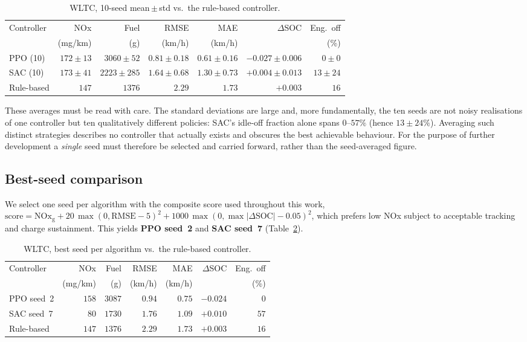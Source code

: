 \begin{table}[ht]
\centering
\caption{WLTC, 10-seed mean\,$\pm$\,std vs.\ the rule-based controller.}
\label{tab:wltc-mean}
\small
\begin{tabular}{lrrrrrr}
\toprule
Controller & NOx & Fuel & RMSE & MAE & $\Delta$SOC & Eng.\ off \\
 & (mg/km) & (g) & (km/h) & (km/h) & & (\%) \\
\midrule
PPO (10)   & $172\pm13$ & $3060\pm52$  & $0.81\pm0.18$ & $0.61\pm0.16$ & $-0.027\pm0.006$ & $0\pm0$  \\
SAC (10)   & $173\pm41$ & $2223\pm285$ & $1.64\pm0.68$ & $1.30\pm0.73$ & $+0.004\pm0.013$ & $13\pm24$ \\
Rule-based & $147$      & $1376$       & $2.29$        & $1.73$        & $+0.003$         & $16$ \\
\bottomrule
\end{tabular}
\end{table}

These averages must be read with care. The standard deviations are large and,
more fundamentally, the ten seeds are not noisy realisations of one controller
but ten qualitatively different policies: SAC's idle-off fraction alone spans
$0$--$57\%$ (hence $13\pm24\%$). Averaging such distinct strategies describes no
controller that actually exists and obscures the best achievable behaviour. For
the purpose of further development a \emph{single} seed must therefore be
selected and carried forward, rather than the seed-averaged figure.

\subsection{Best-seed comparison}

We select one seed per algorithm with the composite score used throughout this
work, $\text{score}=\text{NOx}_\text{g}+20\,\max(0,\text{RMSE}-5)^2+1000\,\max(0,\max|\Delta\text{SOC}|-0.05)^2$,
which prefers low NOx subject to acceptable tracking and charge sustainment. This
yields \textbf{PPO seed~2} and \textbf{SAC seed~7}
(Table~\ref{tab:wltc-best}).

\begin{table}[ht]
\centering
\caption{WLTC, best seed per algorithm vs.\ the rule-based controller.}
\label{tab:wltc-best}
\small
\begin{tabular}{lrrrrrr}
\toprule
Controller & NOx & Fuel & RMSE & MAE & $\Delta$SOC & Eng.\ off \\
 & (mg/km) & (g) & (km/h) & (km/h) & & (\%) \\
\midrule
PPO seed~2 & $158$ & $3087$ & $0.94$ & $0.75$ & $-0.024$ & $0$  \\
SAC seed~7 & $80$  & $1730$ & $1.76$ & $1.09$ & $+0.010$ & $57$ \\
Rule-based & $147$ & $1376$ & $2.29$ & $1.73$ & $+0.003$ & $16$ \\
\bottomrule
\end{tabular}
\end{table}

